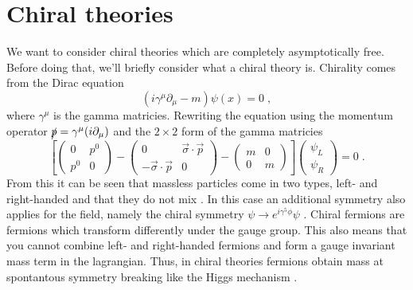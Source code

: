 \section{Chiral theories}
We want to consider chiral theories which are completely asymptotically free. Before doing that, we'll briefly consider what a chiral theory is. Chirality comes from the Dirac equation 
\begin{equation}
    (i\gamma^\mu \partial_\mu - m)\psi (x) =0\;,
\end{equation}
where $\gamma^\mu$ is the gamma matricies.  Rewriting the equation using the momentum operator $\slashed{p}=\gamma^\mu(i\partial_\mu)$ and the $2\times 2$ form of the gamma matricies
\begin{equation}
\left[ 
\begin{pmatrix}
0 & p^0 \\
p^0 & 0
\end{pmatrix}
- 
\begin{pmatrix}
0 & \vec\sigma \cdot \vec p \\
-\vec \sigma \cdot\vec{p}  & 0
\end{pmatrix}
- 
\begin{pmatrix}
m & 0 \\
0 & m
\end{pmatrix}
\right]
\begin{pmatrix}
\psi_L \\
\psi_R
\end{pmatrix}
= 0\;.
\end{equation}
From this it can be seen that massless particles come in two types, left- and right-handed and that they do not mix \cite{for dummies}. In this case an additional symmetry also applies for the field, namely the chiral symmetry $\psi\to e^{i\gamma^5\phi}\psi$ \cite{zee}. Chiral fermions are fermions which transform differently under the gauge group. This also means that you cannot combine left- and right-handed fermions and form a gauge invariant mass term in the lagrangian. Thus, in chiral theories fermions obtain mass at spontantous symmetry breaking like the Higgs mechanism \cite{Peskin:1995ev}.

